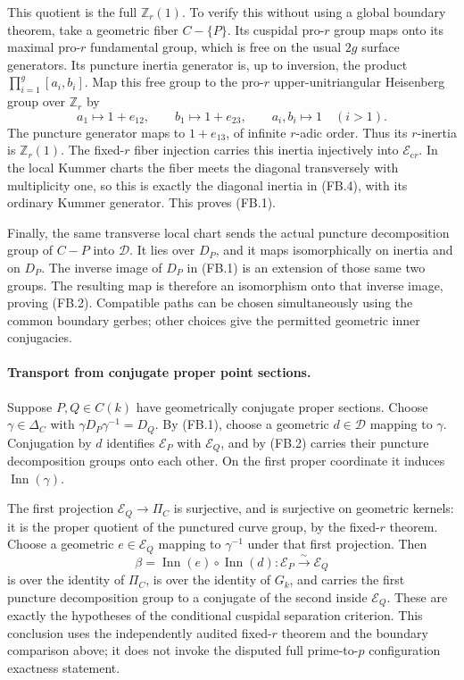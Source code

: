 This quotient is the full \(\mathbb Z_r(1)\).
To verify this without using a global boundary theorem,
take a geometric fiber \(C-\{P\}\). Its cuspidal
pro-\(r\) group maps onto its maximal pro-\(r\)
fundamental group, which is free on the usual
\(2g\) surface generators. Its puncture inertia
generator is, up to inversion, the product
\(\prod_{i=1}^g[a_i,b_i]\). Map this free group to
the pro-\(r\) upper-unitriangular Heisenberg group
over \(\mathbb Z_r\) by
\[
 a_1\longmapsto 1+e_{12},\qquad
 b_1\longmapsto 1+e_{23},\qquad
 a_i,b_i\longmapsto1\quad(i>1).
                                                        \tag{FB.5}
\]
The puncture generator maps to \(1+e_{13}\), of
infinite \(r\)-adic order. Thus its \(r\)-inertia
is \(\mathbb Z_r(1)\). The fixed-\(r\) fiber
injection carries this inertia injectively into
\(\mathcal E_{\mathrm{c}r}\). In the local Kummer
charts the fiber meets the diagonal transversely
with multiplicity one, so this is exactly the
diagonal inertia in (FB.4), with its ordinary
Kummer generator. This proves (FB.1).

Finally, the same transverse local chart sends the
actual puncture decomposition group of \(C-P\)
into \(\mathcal D\). It lies over \(D_P\), and
it maps isomorphically on inertia and on \(D_P\).
The inverse image of \(D_P\) in (FB.1) is an
extension of those same two groups. The resulting
map is therefore an isomorphism onto that inverse
image, proving (FB.2). Compatible paths can be chosen
simultaneously using the common boundary gerbes;
other choices give the permitted geometric inner
conjugacies.

\paragraph{Transport from conjugate proper point sections.}
Suppose \(P,Q\in C(k)\) have geometrically conjugate
proper sections. Choose
\(\gamma\in\Delta_C\) with
\(\gamma D_P\gamma^{-1}=D_Q\).
By (FB.1), choose a geometric
\(d\in\mathcal D\) mapping to \(\gamma\).
Conjugation by \(d\) identifies
\(\mathcal E_P\) with \(\mathcal E_Q\), and by
(FB.2) carries their puncture decomposition groups
onto each other. On the first proper coordinate
it induces \(\operatorname{Inn}(\gamma)\).

The first projection
\(\mathcal E_Q\to\Pi_C\) is surjective, and is
surjective on geometric kernels: it is the proper
quotient of the punctured curve group, by the
fixed-\(r\) theorem. Choose a geometric
\(e\in\mathcal E_Q\) mapping to \(\gamma^{-1}\)
under that first projection. Then
\[
            \beta=\operatorname{Inn}(e)\circ
                         \operatorname{Inn}(d):
                 \mathcal E_P\xrightarrow{\sim}\mathcal E_Q
                                                        \tag{FB.6}
\]
is over the identity of \(\Pi_C\), is over the
identity of \(G_k\), and carries the first puncture
decomposition group to a conjugate of the second
inside \(\mathcal E_Q\). These are exactly the
hypotheses of the conditional cuspidal separation
criterion. This conclusion uses the independently
audited fixed-\(r\) theorem and the boundary
comparison above; it does not invoke the disputed full prime-to-\(p\)
configuration exactness statement.

